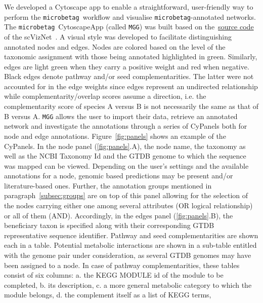 \documentclass[sn-mathphys,Numbered]{sn-jnl}  %
\theoremstyle{thmstyleone}%
\theoremstyle{thmstyletwo}%
\theoremstyle{thmstylethree}%
\newcommand{\microbetag}{\texttt{microbetag}}
\begin{document}
        We developed a Cytoscape app to enable a straightforward, user-friendly way to perform the \microbetag~\space workflow and visualise \microbetag-annotated networks.
        The \microbetag~\space CytoscapeApp (called \texttt{MGG}) was built based on the~\href{https://github.com/RBVI/scNetViz}{source code} of the scVizNet~\cite{choudhary2021scnetviz}.
        A visual style was developed to facilitate distinguishing annotated nodes and edges.
        Nodes are colored based on the level of the taxonomic assignment with those being annotated highlighted in green.
        Similarly, edges are light green when they carry a positive weight and red when negative. 
        Black edges denote pathway and/or seed complementarities.
        The latter were not 
        accounted for in the
        edge weights since edges represent an undirected relationship while 
        complementarity/overlap scores
        assume a direction, i.e. the complementarity score of species A versus B is not necessarily the same as that of B versus A.
        \texttt{MGG} allows the user to import their data, retrieve an annotated network and investigate the annotations through a series of CyPanels both for node and edge annotations.
        Figure~\ref{fig:panels} shows an example of the CyPanels.
        In the node panel (\ref{fig:panels}.A), the node name, the taxonomy as well as the NCBI Taxonomy Id and the GTDB genome to which the sequence was mapped can be viewed. 
        Depending on the user's settings and the available annotations for a node, genomic based predictions may be present and/or literature-based ones.
        Further, the annotation groups mentioned in paragraph~\ref{subsec:groups} are on top of this panel allowing for the selection of the nodes carrying either one among several attributes (OR logical relationship) or all of them (AND).
        Accordingly, in the edges panel (\ref{fig:panels}.B), the beneficiary taxon is specified along with their corresponding GTDB representative sequence identifier.
        Pathway and seed complementarities are shown each in a table.
        Potential metabolic interactions are shown in a sub-table entitled with the genome pair under consideration, as several GTDB genomes may have been assigned to a node.
        In case of pathway complementarities, these tables consist of six columns: a. the KEGG MODULE id of the module to be completed, b. its description, 
        c. a more general metabolic category to which the module belongs,
        d. the complement itself as a list of KEGG terms, 
\end{document}
